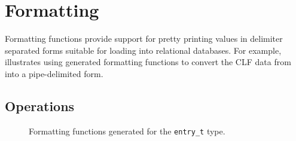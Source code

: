\chapter{Formatting}
\label{chap:formatting}
Formatting functions provide support for pretty printing \pads{}
values in delimiter separated forms suitable for loading into
relational databases.  For example,
 illustrates using generated
formatting functions to convert the CLF data from
 into a pipe-delimited form.


\section{Operations}
\begin{figure}
\caption{Formatting functions generated for the \texttt{entry\_t}  type.}
\label{figure:formatting-functions}
\end{figure}
